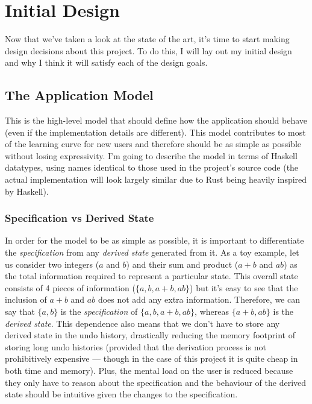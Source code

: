 \documentclass[12pt]{article}
\begin{document}
\section{Initial Design}

Now that we've taken a look at the state of the art, it's time to start making design decisions
about this project.  To do this, I will lay out my initial design and why I think it will satisfy
each of the design goals.

\subsection{The Application Model}

This is the high-level model that should define how the application should behave (even if the
implementation details are different).  This model contributes to most of the learning curve for new
users and therefore should be as simple as possible without losing expressivity.  I'm going to
describe the model in terms of Haskell datatypes, using names identical to those used in the
project's source code (the actual implementation will look largely similar due to Rust being heavily
inspired by Haskell).

\subsubsection{Specification vs Derived State}

In order for the model to be as simple as possible, it is important to differentiate the
\emph{specification} from any \emph{derived state} generated from it.  As a toy example, let us
consider two integers ($a$ and $b$) and their sum and product ($a + b$ and $ab$) as the total
information required to represent a particular state.  This overall state consists of 4 pieces of
information ($\{a, b, a + b, ab\}$) but it's easy to see that the inclusion of $a + b$ and $ab$ does
not add any extra information.  Therefore, we can say that $\{a, b\}$ is the \emph{specification} of
$\{a, b, a + b, ab\}$, whereas $\{a + b, ab\}$ is the \emph{derived state}.  This dependence also
means that we don't have to store any derived state in the undo history, drastically reducing the
memory footprint of storing long undo histories (provided that the derivation process is not
prohibitively expensive --- though in the case of this project it is quite cheap in both time and
memory).  Plus, the mental load on the user is reduced because they only have to reason about the
specification and the behaviour of the derived state should be intuitive given the changes to the
specification.
\end{document}
